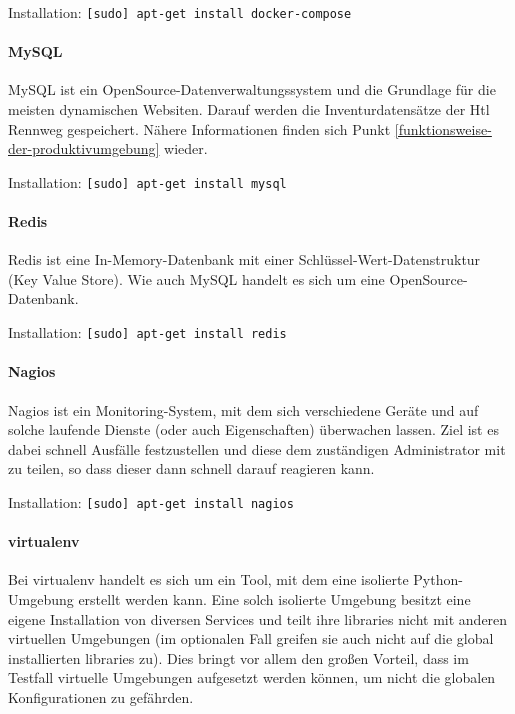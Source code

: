 Installation: \texttt{{[}sudo{]}\ apt-get\ install\ docker-compose}

\hypertarget{mysql}{%
\paragraph{MySQL}\label{mysql}}

MySQL ist ein OpenSource-Datenverwaltungssystem und die Grundlage für
die meisten dynamischen Websiten. Darauf werden die Inventurdatensätze
der Htl Rennweg gespeichert. Nähere Informationen finden sich Punkt
\ref{funktionsweise-der-produktivumgebung} wieder.

Installation: \texttt{{[}sudo{]}\ apt-get\ install\ mysql}

\hypertarget{redis}{%
\paragraph{Redis}\label{redis}}

Redis ist eine In-Memory-Datenbank mit einer
Schlüssel-Wert-Datenstruktur (Key Value Store). Wie auch MySQL handelt
es sich um eine OpenSource-Datenbank.

Installation: \texttt{{[}sudo{]}\ apt-get\ install\ redis}

\hypertarget{nagios}{%
\paragraph{Nagios}\label{nagios}}

Nagios ist ein Monitoring-System, mit dem sich verschiedene Geräte und
auf solche laufende Dienste (oder auch Eigenschaften) überwachen lassen.
Ziel ist es dabei schnell Ausfälle festzustellen und diese dem
zuständigen Administrator mit zu teilen, so dass dieser dann schnell
darauf reagieren kann.

Installation: \texttt{{[}sudo{]}\ apt-get\ install\ nagios}

\hypertarget{virtualenv}{%
\paragraph{virtualenv}\label{virtualenv}}

Bei virtualenv handelt es sich um ein Tool, mit dem eine isolierte
Python-Umgebung erstellt werden kann. Eine solch isolierte Umgebung
besitzt eine eigene Installation von diversen Services und teilt ihre
libraries nicht mit anderen virtuellen Umgebungen (im optionalen Fall
greifen sie auch nicht auf die global installierten libraries zu). Dies
bringt vor allem den großen Vorteil, dass im Testfall virtuelle
Umgebungen aufgesetzt werden können, um nicht die globalen
Konfigurationen zu gefährden.


